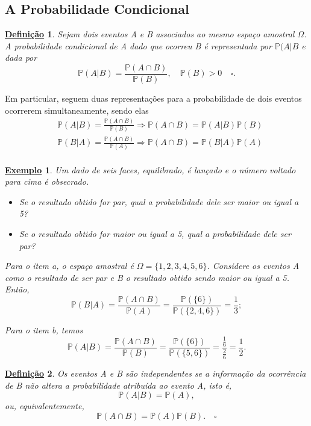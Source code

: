 \documentclass{article}
\newtheorem*{def*}{\underline{Defini\c c\~ao}}
\newtheorem{example}{\underline{Exemplo}}
\begin{document}
\subsection{A Probabilidade Condicional}
\begin{def*}
  Sejam dois eventos A e B associados ao mesmo espaço amostral \(\Omega \). A probabilidade condicional de A 
  dado que ocorreu B é representada por \(\mathbb{P}(A|B\) e dada por 
  \[
    \mathbb{P}(A|B) = \frac{\mathbb{P}(A\cap B)}{\mathbb{P}(B)},\quad \mathbb{P}(B) > 0\quad \square.
  \]
\end{def*}
Em particular, seguem duas representações para a probabilidade de dois eventos ocorrerem simultaneamente, sendo elas
\begin{align*}
    &\mathbb{P}(A|B) = \frac{\mathbb{P}(A\cap B)}{\mathbb{P}(B)} \Rightarrow \mathbb{P}(A\cap B) = \mathbb{P}(A|B)\mathbb{P}(B)\\
    &\mathbb{P}(B|A) = \frac{\mathbb{P}(A\cap B)}{\mathbb{P}(A)} \Rightarrow \mathbb{P}(A\cap B) = \mathbb{P}(B|A)\mathbb{P}(A)\\
\end{align*}
\begin{example}
  Um dado de seis faces, equilibrado, é lançado e o número voltado para cima é obsecrado.
  \begin{itemize}
    \item[(a)] Se o resultado obtido for par, qual a probabilidade dele ser maior ou igual a 5?

    \item[(b)] Se o resultado obtido for maior ou igual a 5, qual a probabilidade dele ser par?
  \end{itemize}

  Para o item a, o espaço amostral é \(\Omega = \{1, 2, 3, 4, 5, 6\}\). Considere os eventos
  A como o resultado de ser par e B o resultado obtido sendo maior ou igual a 5. Então, 
  \[
    \mathbb{P}(B|A) = \frac{\mathbb{P}(A\cap B)}{\mathbb{P}(A)} = \frac{\mathbb{P}(\{6\})}{\mathbb{P}(\{2, 4, 6\})} = \frac{1}{3};
  \]

  Para o item b, temos 
  \[
    \mathbb{P}(A|B) = \frac{\mathbb{P}(A\cap B)}{\mathbb{P}(B)} = \frac{\mathbb{P}(\{6\})}{\mathbb{P}(\{5, 6\})} = \frac{\frac{1}{6}}{\frac{2}{6}} = \frac{1}{2}.
  \]
\end{example}
\begin{def*}
  Os eventos A e B são independentes se a informação da ocorrência de B não altera a probabilidade atribuída ao evento A, isto é, 
  \[
    \mathbb{P}(A|B) = \mathbb{P}(A),
  \]
  ou, equivalentemente, 
  \[
    \mathbb{P}(A\cap B) = \mathbb{P}(A)\mathbb{P}(B).\quad\square
  \]
\end{def*}
\end{document}

